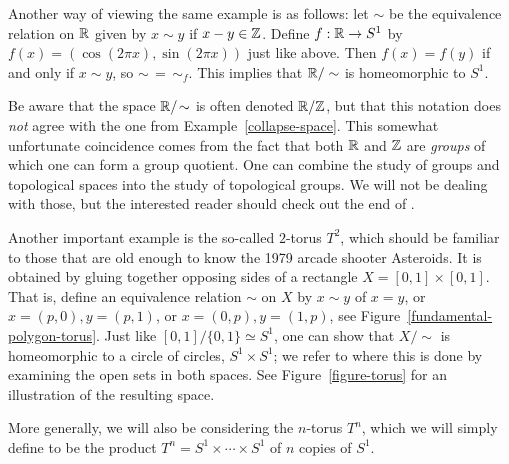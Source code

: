 \begin{example}
  Another way of viewing the same example is as follows: let $\sim$ be the equivalence relation on $\mathbb{R}$ given by $x \sim y$ if $x-y \in \mathbb{Z}$. Define $f : \mathbb{R} \to S^1$ by $f(x) = (\cos(2\pi x), \sin(2\pi x))$ just like above. Then $f(x) = f(y)$ if and only if $x \sim y$, so $\sim \,=\, \sim_f$. This implies that $\mathbb{R}/\sim$ is homeomorphic to $S^1$.
  
  Be aware that the space $\mathbb{R}/\!\sim$ is often denoted $\mathbb{R}/\mathbb{Z}$, but that this notation does \emph{not} agree with the one from Example~\ref{collapse-space}. This somewhat unfortunate coincidence comes from the fact that both $\mathbb{R}$ and $\mathbb{Z}$ are \emph{groups} of which one can form a group quotient. One can combine the study of groups and topological spaces into the study of topological groups. We will not be dealing with those, but the interested reader should check out the end of \cite[\S 22]{Mun}.
\end{example}
\begin{example}
  \label{torus-example-gluing}
  Another important example is the so-called $2$-torus $T^2$, which should be familiar to those that are old enough to know the 1979 arcade shooter Asteroids. It is obtained by gluing together opposing sides of a rectangle $X=[0,1] \times [0,1]$. That is, define an equivalence relation $\sim$ on $X$ by $x \sim y$ of $x = y$, or $x=(p,0),y=(p,1)$, or $x=(0,p),y=(1,p)$, see Figure~\ref{fundamental-polygon-torus}. Just like $[0,1]/\{0,1\} \simeq S^1$, one can show that $X /\!\sim$ is homeomorphic to a circle of circles, $S^1 \times S^1$; we refer to \cite[\S 22]{Mun} where this is done by examining the open sets in both spaces. See Figure~\ref{figure-torus} for an illustration of the resulting space.
  
  More generally, we will also be considering the $n$-torus $T^n$, which we will simply define to be the product $T^n = S^1 \times \cdots \times S^1$ of $n$ copies of $S^1$.
\end{example}
